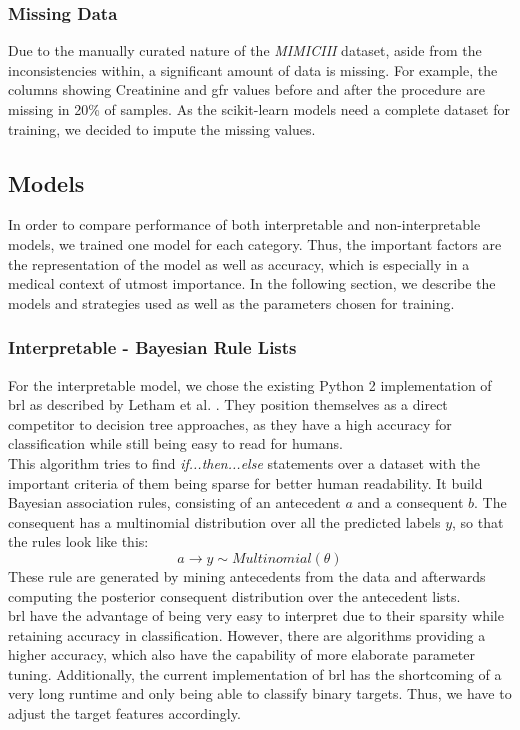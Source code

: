 \documentclass[conference,comsoc]{IEEEtran}
\begin{document}
\subsubsection{Missing Data}
Due to the manually curated nature of the \emph{MIMICIII} dataset, aside from the inconsistencies within, a significant amount of data is missing. 
For example, the columns showing Creatinine and \gls{gfr} values before and after the procedure are missing in 20\% of samples.
As the scikit-learn models need a complete dataset for training, we decided to impute the missing values.


\subsection{Models}
In order to compare performance of both interpretable and non-interpretable models, we trained one model for each category.
Thus, the important factors are the representation of the model as well as accuracy, which is especially in a medical context of utmost importance.
In the following section, we describe the models and strategies used as well as the parameters chosen for training.

\subsubsection{Interpretable - Bayesian Rule Lists}
For the interpretable model, we chose the existing Python 2 implementation of \gls{brl} as described by Letham et al. \cite{Letham2015}.
They position themselves as a direct competitor to decision tree approaches, as they have a high accuracy for classification while still being easy to read for humans. \\
This algorithm tries to find \emph{if...then...else} statements over a dataset with the important criteria of them being sparse for better human readability. 
It build Bayesian association rules, consisting of an antecedent $a$ and a consequent $b$.
The consequent has a multinomial distribution over all the predicted labels $y$, so that the rules look like this:
\begin{equation}
a \rightarrow y \sim Multinomial(\theta)
\end{equation}
These rule are generated by mining antecedents from the data and afterwards computing the posterior consequent distribution over the antecedent lists. \\
\gls{brl} have the advantage of being very easy to interpret due to their sparsity while retaining accuracy in classification.
However, there are algorithms providing a higher accuracy, which also have the capability of more elaborate parameter tuning.
Additionally, the current implementation of \gls{brl} has the shortcoming of a very long runtime and only being able to classify binary targets. 
Thus, we have to adjust the target features accordingly.
\end{document}
